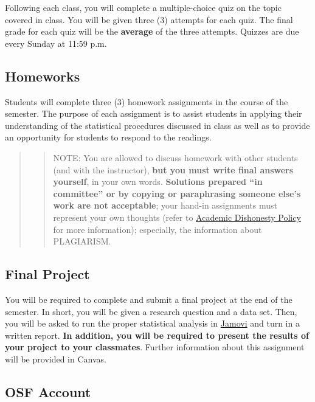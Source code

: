 \documentclass[11pt,]{article}
\begin{document}
Following each class, you will complete a multiple-choice quiz on the
topic covered in class. You will be given three (3) attempts for each
quiz. The final grade for each quiz will be the \textbf{average} of the
three attempts. Quizzes are due every Sunday at 11:59 p.m.

\hypertarget{homeworks}{%
\subsection{Homeworks}\label{homeworks}}

Students will complete three (3) homework assignments in the course of
the semester. The purpose of each assignment is to assist students in
applying their understanding of the statistical procedures discussed in
class as well as to provide an opportunity for students to respond to
the readings.

\begin{quote}
\begin{quote}
NOTE: You are allowed to discuss homework with other students (and with
the instructor), \textbf{but you must write final answers yourself}, in
your own words. \textbf{Solutions prepared ``in committee'' or by
copying or paraphrasing someone else's work are not acceptable}; your
hand-in assignments must represent your own thoughts (refer to
\protect\hyperlink{dishonesty}{Academic Dishonesty Policy} for more
information); especially, the information about PLAGIARISM.
\end{quote}
\end{quote}

\hypertarget{final-project}{%
\subsection{Final Project}\label{final-project}}

You will be required to complete and submit a final project at the end
of the semester. In short, you will be given a research question and a
data set. Then, you will be asked to run the proper statistical analysis
in \protect\hyperlink{supplies}{Jamovi} and turn in a written report.
\textbf{In addition, you will be required to present the results of your
project to your classmates}. Further information about this assignment
will be provided in Canvas.

\hypertarget{osf-account}{%
\subsection{OSF Account}\label{osf-account}}
\end{document}
